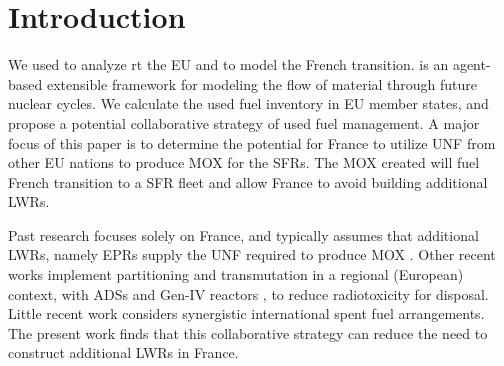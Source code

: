 
\section{Introduction}
We used \Cyclus \cite{huff_fundamental_2016} to analyze
rt the \gls{EU} and to model the French transition. \Cyclus is an agent-based extensible
framework for modeling the flow of material through future nuclear cycles.
We calculate the used fuel
inventory in \gls{EU} member states, and propose a potential collaborative strategy of used fuel
management.
A major focus of this paper is to determine the potential for France to utilize
\gls{UNF} from other \gls{EU} nations to produce \gls{MOX} for the \glspl{SFR}.
The \gls{MOX} created will fuel French transition to a \gls{SFR} fleet
and allow France to avoid building additional \glspl{LWR}.

Past research focuses solely on France, and typically assumes that additional \glspl{LWR},
namely \glspl{EPR} supply the \gls{UNF} required to produce \gls{MOX} \cite{carre_overview_2009, martin_symbiotic_2017, freynet_multiobjective_2016}.
Other recent works implement partitioning and transmutation
in a regional (European) context, with \glspl{ADS} and Gen-IV reactors \cite{fazio_study_2013},
to reduce radiotoxicity for disposal.
Little recent work considers synergistic international spent fuel arrangements.
The present work finds that this collaborative strategy can reduce the
need to construct additional \glspl{LWR} in France.
